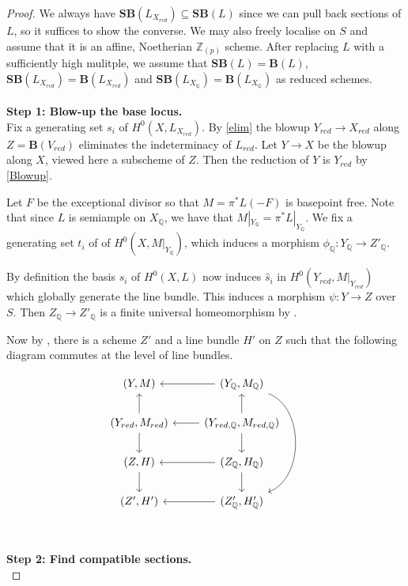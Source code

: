 \documentclass[a4paper,12pt]{book}
\newcommand{\SB}{\mathbf{SB}}
\newcommand{\BB}{\mathbf{B}}
\begin{document}
\begin{proof}
	
	We always have $\SB(L_{X_{red}}) \subseteq \SB(L)$ since we can pull back sections of $L$, so it suffices to show the converse. We may also freely localise on $S$ and assume that it is an affine, Noetherian $\mathbb{Z}_{(p)}$ scheme. After replacing $L$ with a sufficiently high mulitple, we assume that $\SB(L)=\BB(L)$, $\SB(L_{X_{red}})=\BB(L_{X_{red}})$ and $\SB(L_{X_{\mathbb{Q}}})=\BB(L_{X_{\mathbb{Q}}})$ as reduced schemes.\\
	\\
	\textbf{Step 1: Blow-up the base locus.}\\
	
	Fix a generating set $s_{i}$ of $H^{0}(X,L_{X_{red}})$.	By \autoref{elim} the blowup $Y_{red} \to X_{red}$ along $Z=\BB(V_{red})$ eliminates the indeterminacy of $L_{red}$. Let $Y \to X$ be the blowup along $X$, viewed here a subscheme of $Z$. Then the reduction of $Y$ is $Y_{red}$ by \autoref{Blowup}.
	
	Let $F$ be the exceptional divisor so that $M = \pi^{*}L(-F)$ is basepoint free. Note that since $L$ is semiample on $X_{\mathbb{Q}}$, we have that $M|_{Y_{\mathbb{Q}}}=\pi^{*}L|_{Y_{\mathbb{Q}}}$. We fix a generating set $t_{i}$ of of $H^{0}(X,M|_{Y_{\mathbb{Q}}})$, which induces a morphism $\phi_{\mathbb{Q}}\colon Y_{\mathbb{Q}} \to Z'_{\mathbb{Q}}$. 
	
	By definition the basis $s_{i}$ of $H^{0}(X,L)$ now induces $\hat{s}_{i}$ in $H^{0}(Y_{red},M|_{Y_{red}})$ which globally generate the line bundle. This induces a morphism $\psi: Y \to Z$ over $S$. Then $Z_{\mathbb{Q}} \to Z'_{\mathbb{Q}}$ is a finite universal homeomorphism by \cite[Tag 02OG]{stacks-project}. 
	
	Now by \cite[Theorem 1.7, Corollary 4.20 and Lemma 2.20]{witaszek2020keels}, there is a scheme $Z'$ and a line bundle $H'$ on $Z$ such that the following diagram commutes at the level of line bundles.
	
	\[\begin{tikzcd}
	{(Y,M)}                                 & {(Y_{\mathbb{Q}},M_{\mathbb{Q}})} \arrow[ddd, bend left=70] \arrow[l]     \\
	{(Y_{red},M_{red})} \arrow[d] \arrow[u] & {(Y_{red, \mathbb{Q}},M_{red, \mathbb{Q}})} \arrow[d] \arrow[u] \arrow[l] \\
	{(Z,H)} \arrow[d]                       & {(Z_{\mathbb{Q}},H_{\mathbb{Q}})} \arrow[l] \arrow[d]                    \\
	{(Z',H')}                               & {(Z'_{\mathbb{Q}},H'_{\mathbb{Q}})} \arrow[l]                            
	\end{tikzcd}\]\\
	\\
	\textbf{Step 2: Find compatible sections.}\\
	

\end{proof}
\end{document}
